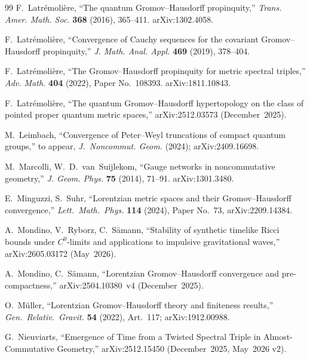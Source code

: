 \documentclass[11pt,a4paper]{article}
\theoremstyle{plain}
\theoremstyle{definition}
\begin{document}
\begin{thebibliography}{99}
F.~Latr\'emoli\`ere, ``The quantum Gromov--Hausdorff propinquity,''
\emph{Trans. Amer. Math. Soc.} \textbf{368} (2016), 365--411.
arXiv:1302.4058.

F.~Latr\'emoli\`ere, ``Convergence of Cauchy sequences for the
covariant Gromov--Hausdorff propinquity,'' \emph{J. Math. Anal. Appl.}
\textbf{469} (2019), 378--404.

F.~Latr\'emoli\`ere, ``The Gromov--Hausdorff propinquity for
metric spectral triples,'' \emph{Adv. Math.} \textbf{404} (2022),
Paper No.~108393. arXiv:1811.10843.

F.~Latr\'emoli\`ere, ``The quantum Gromov--Hausdorff hypertopology
on the class of pointed proper quantum metric spaces,''
arXiv:2512.03573 (December~2025).

M.~Leimbach, ``Convergence of Peter--Weyl
truncations of compact quantum groups,'' to appear, \emph{J.~Noncommut.
Geom.} (2024); arXiv:2409.16698.

M.~Marcolli, W.~D.~van~Suijlekom, ``Gauge networks in noncommutative
geometry,'' \emph{J. Geom. Phys.} \textbf{75} (2014), 71--91.
arXiv:1301.3480.

E.~Minguzzi, S.~Suhr, ``Lorentzian metric spaces and their
Gromov--Hausdorff convergence,''
\emph{Lett.~Math.~Phys.} \textbf{114} (2024), Paper No.~73, arXiv:2209.14384.

A.~Mondino, V.~Ryborz, C.~S\"amann, ``Stability of synthetic timelike
Ricci bounds under $C^{0}$-limits and applications to impulsive
gravitational waves,'' arXiv:2605.03172 (May~2026).

A.~Mondino, C.~S\"amann, ``Lorentzian Gromov--Hausdorff convergence
and pre-compactness,'' arXiv:2504.10380~v4 (December~2025).

O.~M\"uller, ``Lorentzian Gromov--Hausdorff theory and finiteness
results,'' \emph{Gen.~Relativ.~Gravit.} \textbf{54} (2022), Art.~117;
arXiv:1912.00988.

G.~Nieuviarts, ``Emergence of Time from a Twisted Spectral Triple in
Almost-Commutative Geometry,'' arXiv:2512.15450 (December~2025, May~2026 v2).


\end{thebibliography}
\end{document}
